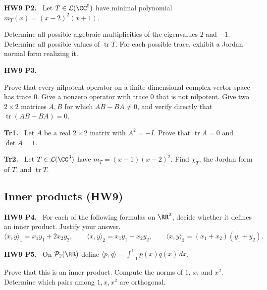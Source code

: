 \documentclass[10pt]{scrartcl}
\DeclareMathOperator{\tr}{tr}
\newcommand{\LL}{\mathcal L}
\newcommand{\PP}{\mathcal P}
\newcommand{\ip}[2]{\langle #1,#2\rangle}
\newenvironment{prob}{\par\bigskip\noindent\begin{minipage}{\linewidth}\setlength{\parskip}{4pt}}{\end{minipage}\par}
\begin{document}
\begin{prob}
\textbf{HW9 P2. }\ Let $T\in\LL(\CC^5)$ have minimal polynomial $m_T(x)=(x-2)^2(x+1)$.
\begin{enumerate}[(a)]
  \ii Determine all possible algebraic multiplicities of the eigenvalues $2$ and $-1$.
  \ii Determine all possible values of $\tr T$.
  \ii For each possible trace, exhibit a Jordan normal form realizing it.
\end{enumerate}
\end{prob}

\begin{prob}
\textbf{HW9 P3. }\ 
\begin{enumerate}[(a)]
  \ii Prove that every nilpotent operator on a finite-dimensional complex vector space has trace $0$.
  \ii Give a nonzero operator with trace $0$ that is not nilpotent.
  \ii Give two $2\times2$ matrices $A,B$ for which $AB-BA\ne0$, and verify directly that $\tr(AB-BA)=0$.
\end{enumerate}
\end{prob}

\begin{prob}
\textbf{Tr1. }\ Let $A$ be a real $2\times2$ matrix with $A^2=-I$. Prove that $\tr A=0$ and $\det A=1$.
\end{prob}

\begin{prob}
\textbf{Tr2. }\ Let $T\in\LL(\CC^3)$ have $m_T=(x-1)(x-2)^2$. Find $\chi_T$, the Jordan form of $T$, and $\tr T$.
\end{prob}

\subsection{Inner products (HW9)}

\begin{prob}
\textbf{HW9 P4. }\ For each of the following formulas on $\RR^2$, decide whether it defines an inner product. Justify your answer.
\[ \ip xy_1=x_1y_1+2x_2y_2,\qquad\ip xy_2=x_1y_1-x_2y_2,\qquad\ip xy_3=(x_1+x_2)(y_1+y_2). \]
\end{prob}

\begin{prob}
\textbf{HW9 P5. }\ On $\PP_2(\RR)$ define $\ip pq=\int_{-1}^1p(x)q(x)\,dx$.
\begin{enumerate}[(a)]
  \ii Prove that this is an inner product.
  \ii Compute the norms of $1$, $x$, and $x^2$.
  \ii Determine which pairs among $1,x,x^2$ are orthogonal.
\end{enumerate}
\end{prob}
\end{document}
